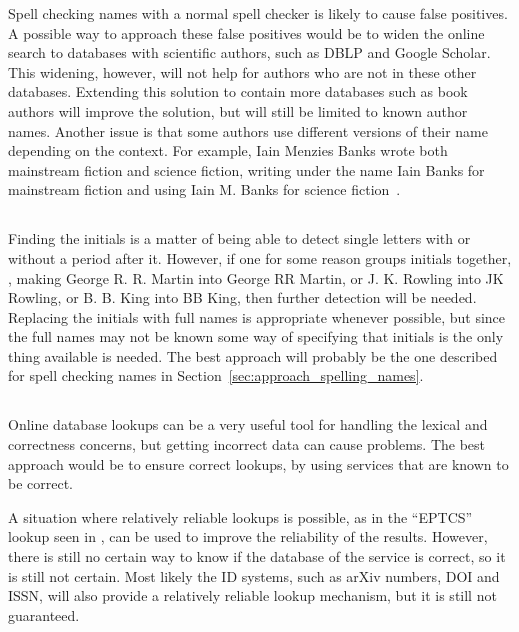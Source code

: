 Spell checking names with a normal spell checker is likely to cause
false positives.  A possible way to approach these false positives
would be to widen the online search to databases with scientific
authors, such as DBLP and Google Scholar.  This widening, however,
will not help for authors who are not in these other databases.
Extending this solution to contain more databases such as book authors
will improve the solution, but will still be limited to known author
names.  Another issue is that some authors use different versions of
their name depending on the context.  For example, Iain Menzies Banks
wrote both mainstream fiction and science fiction, writing under the
name Iain Banks for mainstream fiction and using Iain M. Banks for
science fiction~\cite{community2016_banks}.


\subsection{}

Finding the initials is a matter of being able to detect single
letters with or without a period after it.  However, if one for some
reason groups initials together, \eg, making George R. R. Martin into
George RR Martin, or J. K. Rowling into JK Rowling, or B. B. King into
BB King, then further detection will be needed.  Replacing the
initials with full names is appropriate whenever possible, but since
the full names may not be known some way of specifying that initials
is the only thing available is needed.  The best approach will
probably be the one described for spell checking names in
Section~\ref{sec:approach_spelling_names}.


\subsection{}
\label{sec:approach_look_ups}

Online database lookups can be a very useful tool for handling the
lexical and correctness concerns, but getting incorrect data can cause
problems.  The best approach would be to ensure correct lookups, by
using services that are known to be correct.

A situation where relatively reliable lookups is possible, as in the
``EPTCS'' lookup seen in , can be used to
improve the reliability of the results.  However, there is still no
certain way to know if the database of the service is correct, so it
is still not certain.  Most likely the ID systems, such as arXiv
numbers, DOI and ISSN, will also provide a relatively reliable lookup
mechanism, but it is still not guaranteed.

